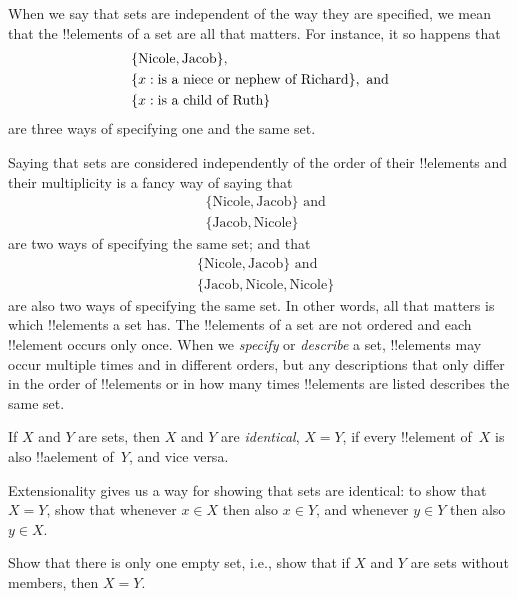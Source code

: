 \documentclass[../../../include/open-logic-section]{subfiles}
\begin{document}
\begin{explain}
When we say that sets are independent of the way they are specified,
we mean that the !!{element}s of a set are all that matters. For instance,
it so happens that
\begin{align*}
  & \{\text{Nicole}, \text{Jacob}\},\\
  & \Setabs{x}{\text{is a niece or nephew of Richard}}, \text{ and}\\
  & \Setabs{x}{\text{is a child of Ruth}}
\end{align*}
are three ways of specifying one and the same set.

Saying that sets are considered independently of the order of their
!!{element}s and their multiplicity is a fancy way of saying that
\begin{align*}
  & \{\text{Nicole}, \text{Jacob}\} \text{ and}\\
  & \{\text{Jacob}, \text{Nicole}\}
\end{align*}
are two ways of specifying the same set; and that
\begin{align*}
  & \{\text{Nicole}, \text{Jacob}\} \text{ and}\\
  & \{\text{Jacob}, \text{Nicole}, \text{Nicole}\}
\end{align*}
are also two ways of specifying the same set. In other words, all
that matters is which !!{element}s a set has. The !!{element}s of a
set are not ordered and each !!{element} occurs only once. When we
\emph{specify} or \emph{describe} a set, !!{element}s may occur
multiple times and in different orders, but any descriptions that only
differ in the order of !!{element}s or in how many times !!{element}s
are listed describes the same set.
\end{explain}

\begin{defn}[Extensionality]
  If $X$ and $Y$ are sets, then $X$ and $Y$ are \emph{identical}, $X =
  Y$, if every !!{element} of~$X$ is also !!a{element} of~$Y$, and
  vice versa.
\end{defn}

\begin{explain}
Extensionality gives us a way for showing that sets are identical: to
show that $X = Y$, show that whenever $x \in X$ then also $x \in Y$,
and whenever $y \in Y$ then also $y \in X$.
\end{explain}

\begin{prob}
Show that there is only one empty set, i.e., show that if $X$ and $Y$
are sets without members, then $X = Y$.
\end{prob}
\end{document}
